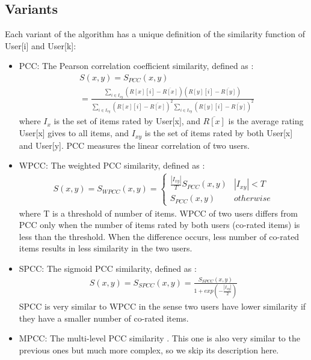 \documentclass[letterpaper]{article}
\begin{document}
\subsection{Variants}
Each variant of the algorithm has a unique definition of the similarity 
function of User[i] and User[k]:
\begin{itemize}
	\item PCC: The Pearson correlation coefficient similarity, defined as 
	\cite{resnick1994grouplens}:
	\begin{align*}
		&S(x, y) = S_{PCC}(x, y) \\
		&= \frac{\sum_{i \in I_{xy}}(R[x][i] - \overline{R[x]})(R[y][i] - 
		\overline{R[y]})}{\sum_{i \in I_{xy}}(R[x][i] - \overline{R[x]})^2 
		\sum_{i 
		\in I_{xy}}(R[y][i] - \overline{R[y]})^2 }
	\end{align*}
	where $ I_{x} $ is the set of items rated by User[x],
	and	$ \overline{R[x]} $ is the average rating User[x] gives to all items,
	and $ I_{xy} $ is the set of items rated by both User[x] and User[y].
	PCC measures the linear correlation of two users.
	\item WPCC: The weighted PCC similarity, defined as 
	\cite{herlocker1999algorithmic}:
	\begin{align*}
		S(x, y) = S_{WPCC}(x, y) = 
		\begin{cases}
			\frac{|I_{xy}|}{T} S_{PCC}(x, y) & |I_{xy}| < T \\
			S_{PCC}(x, y) & otherwise
		\end{cases}
	\end{align*}
	where T is a threshold of number of items. 
	WPCC of two users differs from PCC only when the number of items rated by 
	both users (co-rated items) is less than the threshold. 
	When the difference occurs, less number of co-rated items results in less 
	similarity in the two users.
	\item SPCC: The sigmoid PCC similarity, defined as 
	\cite{jamali2009trustwalker}:
	\begin{align*}
		S(x, y) = S_{SPCC} (x, y) 
		= \frac{S_{SPCC}(x, y)}{1 + exp(-\frac{|I_{xy}|}{2})}
	\end{align*}
	SPCC is very similar to WPCC in the sense two users have lower similarity 
	if they have a smaller number of co-rated items.
	\item MPCC: The multi-level PCC similarity \cite{polatidis2016multi}. 
	This one is also very similar to the previous ones but much more complex, 
	so we skip its description here.
\end{itemize}
\end{document}
